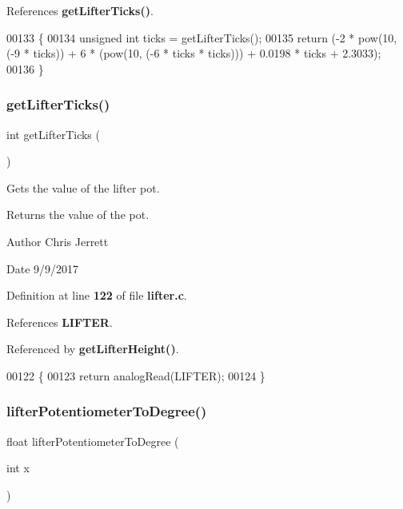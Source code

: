 References \textbf{ get\+Lifter\+Ticks()}.


\begin{DoxyCode}
00133                          \{
00134   \textcolor{keywordtype}{unsigned} \textcolor{keywordtype}{int} ticks = getLifterTicks();
00135   \textcolor{keywordflow}{return} (-2 * pow(10, (-9 * ticks)) + 6 * (pow(10, (-6 * ticks * ticks))) + 0.0198 * ticks + 2.3033);
00136 \}
\end{DoxyCode}
\mbox{\label{lifter_8c_acdf909159b0406c48099843f2306be78}} 
\subsubsection{get\+Lifter\+Ticks()}
{\footnotesize\ttfamily int get\+Lifter\+Ticks (\begin{DoxyParamCaption}{ }\end{DoxyParamCaption})}



Gets the value of the lifter pot. 

\begin{DoxyReturn}{Returns}
the value of the pot. 
\end{DoxyReturn}
\begin{DoxyAuthor}{Author}
Chris Jerrett 
\end{DoxyAuthor}
\begin{DoxyDate}{Date}
9/9/2017 
\end{DoxyDate}


Definition at line \textbf{ 122} of file \textbf{ lifter.\+c}.



References \textbf{ L\+I\+F\+T\+ER}.



Referenced by \textbf{ get\+Lifter\+Height()}.


\begin{DoxyCode}
00122                      \{
00123   \textcolor{keywordflow}{return} analogRead(LIFTER);
00124 \}
\end{DoxyCode}
\mbox{\label{lifter_8c_ab0460888f3213e5510bd25ae1e152a75}} 
\subsubsection{lifter\+Potentiometer\+To\+Degree()}
{\footnotesize\ttfamily float lifter\+Potentiometer\+To\+Degree (\begin{DoxyParamCaption}\item[{int}]{x }\end{DoxyParamCaption})}



